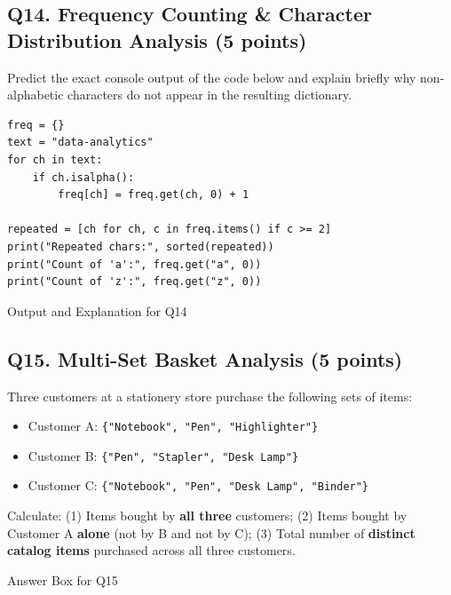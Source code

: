 \documentclass[11pt,a4paper]{article}
\begin{document}
\subsection*{Q14. Frequency Counting \& Character Distribution Analysis (5 points)}
Predict the exact console output of the code below and explain briefly why non-alphabetic characters do not appear in the resulting dictionary.
\begin{lstlisting}
freq = {}
text = "data-analytics"
for ch in text:
    if ch.isalpha():
        freq[ch] = freq.get(ch, 0) + 1

repeated = [ch for ch, c in freq.items() if c >= 2]
print("Repeated chars:", sorted(repeated))
print("Count of 'a':", freq.get("a", 0))
print("Count of 'z':", freq.get("z", 0))
\end{lstlisting}
\begin{answerbox}[height=2.5cm]{Output and Explanation for Q14}\end{answerbox}
\subsection*{Q15. Multi-Set Basket Analysis (5 points)}
Three customers at a stationery store purchase the following sets of items:
\begin{itemize}[leftmargin=2em]
\item Customer A: \texttt{\{"Notebook", "Pen", "Highlighter"\}}
\item Customer B: \texttt{\{"Pen", "Stapler", "Desk Lamp"\}}
\item Customer C: \texttt{\{"Notebook", "Pen", "Desk Lamp", "Binder"\}}
\end{itemize}
Calculate: (1) Items bought by \textbf{all three} customers; (2) Items bought by Customer A \textbf{alone} (not by B and not by C); (3) Total number of \textbf{distinct catalog items} purchased across all three customers.
\begin{answerbox}[height=2.2cm]{Answer Box for Q15}\end{answerbox}
\newpage
\end{document}
